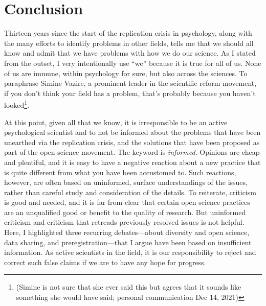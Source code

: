 \documentclass[authordate, empirical]{jote-new-article}
\begin{document}
\section{Conclusion}







Thirteen years since the start of the replication crisis in psychology, along with the many efforts to identify problems in other fields, tells me that we should all know and admit that we have problems with how we do our science. As I stated from the outset, I very intentionally use “we” because it is true for all of us. None of us are immune, within psychology for sure, but also across the sciences. To paraphrase Simine Vazire, a prominent leader in the scientific reform movement, if you don't think your field has a problem, that's probably because you haven't looked\footnote{(Simine is not sure that she ever said this but agrees that it sounds like something she would have said; personal communication Dec 14, 2021)}.







At this point, given all that we know, it is irresponsible to be an active psychological scientist and to not be informed about the problems that have been unearthed via the replication crisis, and the solutions that have been proposed as part of the open science movement. The keyword is \emph{informed}. Opinions are cheap and plentiful, and it is easy to have a negative reaction about a new practice that is quite different from what you have been accustomed to. Such reactions, however, are often based on uninformed, surface understandings of the issues, rather than careful study and consideration of the details. To reiterate, criticism is good and needed, and it is far from clear that certain open science practices are an unqualified good or benefit to the quality of research. But uninformed criticism and criticism that retreads previously resolved issues is not helpful. Here, I highlighted three recurring debates—about diversity and open science, data sharing, and preregistration—that I argue have been based on insufficient information. As active scientists in the field, it is our responsibility to reject and correct such false claims if we are to have any hope for progress.






\printbibliography
\end{document}
